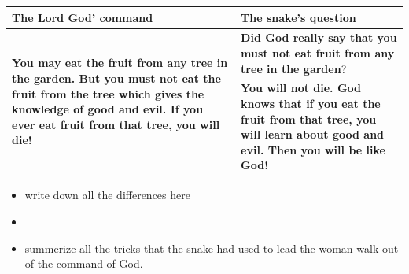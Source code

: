 \begin{itemize}
\begin{itemize}
\begin{table}[H]\centering
\begin{tabular}{p{7.75cm}|p{9.75cm}}\hline\hline
The Lord God' command&The snake's question\\\hline
\multirow{2}{7.9cm}{\textbf{You may eat the fruit from any tree in the garden. But you must not eat the fruit from the tree which gives the knowledge of good and evil. If you ever eat fruit from that tree, you will die!}}
&\textbf{Did God really say that you must not eat fruit from any tree in the garden}?
\\\cline{2-2}
&\textbf{You will not die. God knows that if you eat the fruit from that tree, you will learn about good and evil. Then you will be like God!}
\\\hline
\end{tabular}
\end{table}
\begin{itemize}
\item write down all the differences here
\item
\item summerize all the tricks that the snake had used to lead the woman walk out of the command of God.
\end{itemize}
\end{itemize}



\end{itemize}

